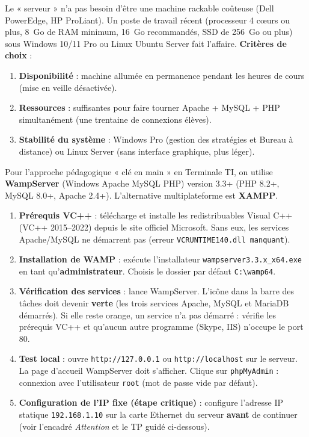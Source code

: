 \documentclass[11pt]{article}
\begin{document}
Le « serveur » n'a pas besoin d'être une machine rackable coûteuse (Dell PowerEdge, HP ProLiant). Un poste de travail récent (processeur 4 cœurs ou plus, 8~Go de RAM minimum, 16~Go recommandés, SSD de 256~Go ou plus) sous Windows 10/11 Pro ou Linux Ubuntu Server fait l'affaire. \textbf{Critères de choix} :
\begin{enumerate}
    \item \textbf{Disponibilité} : machine allumée en permanence pendant les heures de cours (mise en veille désactivée).
    \item \textbf{Ressources} : suffisantes pour faire tourner Apache + MySQL + PHP simultanément (une trentaine de connexions élèves).
    \item \textbf{Stabilité du système} : Windows Pro (gestion des stratégies et Bureau à distance) ou Linux Server (sans interface graphique, plus léger).
\end{enumerate}

Pour l'approche pédagogique « clé en main » en Terminale TI, on utilise \textbf{WampServer} (Windows Apache MySQL PHP) version 3.3+ (PHP 8.2+, MySQL 8.0+, Apache 2.4+). L'alternative multiplateforme est \textbf{XAMPP}.

\begin{methode}
\begin{enumerate}
    \item \textbf{Prérequis VC++} : télécharge et installe les redistribuables Visual C++ (VC++ 2015--2022) depuis le site officiel Microsoft. Sans eux, les services Apache/MySQL ne démarrent pas (erreur \texttt{VCRUNTIME140.dll manquant}).
    \item \textbf{Installation de WAMP} : exécute l'installateur \texttt{wampserver3.3.x\_x64.exe} en tant qu'\textbf{administrateur}. Choisis le dossier par défaut \texttt{C:\textbackslash wamp64}.
    \item \textbf{Vérification des services} : lance WampServer. L'icône dans la barre des tâches doit devenir \textbf{verte} (les trois services Apache, MySQL et MariaDB démarrés). Si elle reste orange, un service n'a pas démarré : vérifie les prérequis VC++ et qu'aucun autre programme (Skype, IIS) n'occupe le port 80.
    \item \textbf{Test local} : ouvre \texttt{http://127.0.0.1} ou \texttt{http://localhost} sur le serveur. La page d'accueil WampServer doit s'afficher. Clique sur \texttt{phpMyAdmin} : connexion avec l'utilisateur \texttt{root} (mot de passe vide par défaut).
    \item \textbf{Configuration de l'IP fixe (étape critique)} : configure l'adresse IP statique \texttt{192.168.1.10} sur la carte Ethernet du serveur \textbf{avant} de continuer (voir l'encadré \emph{Attention} et le TP guidé ci-dessous).
\end{enumerate}
\end{methode}
\end{document}
